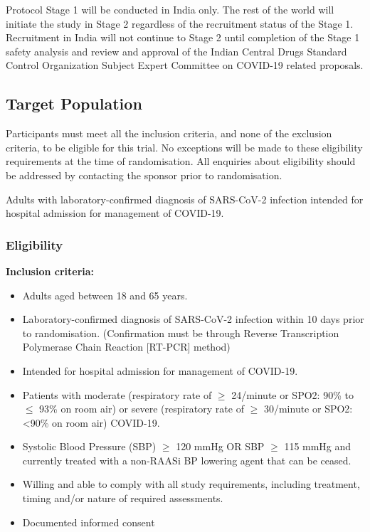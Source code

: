 \documentclass[11pt,parskip=full-]{scrartcl}
\begin{document}
Protocol Stage 1 will be conducted in India only. The rest of the world will initiate the study in Stage 2 regardless of the recruitment status of the Stage 1. Recruitment in India will not continue to Stage 2 until completion of the Stage 1 safety analysis and review and approval of the Indian Central Drugs Standard Control Organization Subject Expert Committee on COVID-19 related proposals.


\subsection{Target Population}
Participants must meet all the inclusion criteria, and none of the exclusion criteria, to be eligible for this trial. No exceptions will be made to these eligibility requirements at the time of randomisation. All enquiries about eligibility should be addressed by contacting the sponsor prior to randomisation.

Adults with laboratory-confirmed diagnosis of SARS-CoV-2 infection intended for hospital admission for management of COVID-19.

\subsubsection{Eligibility}

\textbf{Inclusion criteria:}
\begin{itemize}
    \item Adults aged between 18 and 65 years.
    \item Laboratory-confirmed diagnosis of SARS-CoV-2 infection within 10 days prior to randomisation. (Confirmation must be through Reverse Transcription Polymerase Chain Reaction [RT-PCR] method)
    \item Intended for hospital admission for management of COVID-19.
    \item  Patients with moderate (respiratory rate of $\geq$ 24/minute or SPO2: 90\% to $\leq$ 93\% on room air) or severe (respiratory rate of $\geq$ 30/minute or SPO2: <90\% on room air) COVID-19.
    \item  Systolic Blood Pressure (SBP) $\geq$ 120 mmHg OR SBP $\geq$ 115 mmHg and currently treated with a non-RAASi BP lowering agent that can be ceased.
    \item Willing and able to comply with all study requirements, including treatment, timing and/or nature of required assessments.
    \item Documented informed consent
\end{itemize}
\end{document}
